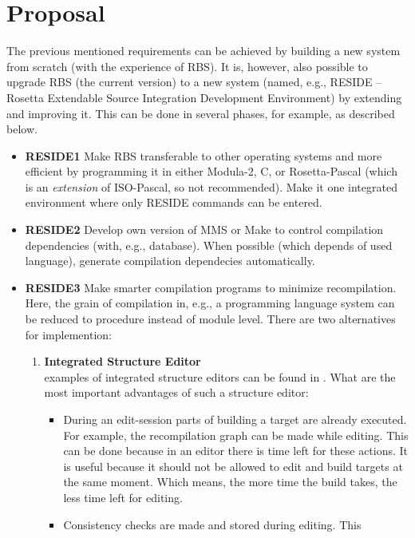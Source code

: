 \section{Proposal}
The previous mentioned requirements can be achieved by building a new system 
from scratch (with the experience of RBS). It is, however, also possible to
upgrade RBS (the current version) to a new system (named, e.g., RESIDE -- 
Rosetta Extendable Source Integration Development Environment) by extending and 
improving it. This can be done in several phases, for example, as described 
below.
\begin{itemize}
  \item {\bf RESIDE1} Make RBS transferable to other operating systems and more 
        efficient by programming it in either Modula-2, C, or Rosetta-Pascal 
        (which is an {\em extension} of ISO-Pascal, so not recommended). Make 
        it one integrated environment where only RESIDE commands can be entered.
  \item {\bf RESIDE2} Develop own version of MMS or Make to control compilation 
        dependencies (with, e.g., database). When possible (which depends of 
        used language), generate compilation dependecies automatically.
  \item {\bf RESIDE3} Make smarter compilation programs to minimize
        recompilation. Here, the grain of compilation in, e.g., a programming 
        language system can be reduced to procedure instead of module level.
        There are two alternatives for implemention: 
   \begin{enumerate}
     \item {\bf Integrated Structure Editor}\\
           examples of integrated structure editors can be found in 
           \cite{acm:proc,bss:ipe}. What are the most important advantages of 
           such a structure editor:
       \begin{itemize}
         \item During an edit-session parts of building a target are already 
               executed. For example, the recompilation graph can be made while
               editing. This can be done because in an editor there is time 
               left for these actions. It is useful because it should not be 
               allowed to edit and build targets at the same moment. Which 
               means, the more time the build takes, the less time left for 
               editing.
         \item Consistency checks are made and stored during editing. This 

\end{itemize}
\end{enumerate}
\end{itemize}

